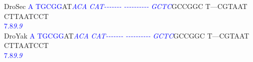 \documentclass[11pt,twoside,reqno,a4paper]{article}
\begin{document}
{DroSec	\textcolor{Blue}{A}	\textcolor{Blue}{T}\textcolor{Blue}{G}\textcolor{Blue}{C}\textcolor{Blue}{G}\textcolor{Blue}{G}AT\textit{\textcolor{Blue}{A}}\textit{\textcolor{Blue}{C}}\textit{\textcolor{Blue}{A}}	\textit{\textcolor{Blue}{C}}\textit{\textcolor{Blue}{A}}\textit{\textcolor{Blue}{T}}\textit{\textcolor{Blue}{-}}\textit{\textcolor{Blue}{-}}\textit{\textcolor{Blue}{-}}\textit{\textcolor{Blue}{-}}\textit{\textcolor{Blue}{-}}\textit{\textcolor{Blue}{-}}\textit{\textcolor{Blue}{-}}	\textit{\textcolor{Blue}{-}}\textit{\textcolor{Blue}{-}}\textit{\textcolor{Blue}{-}}\textit{\textcolor{Blue}{-}}\textit{\textcolor{Blue}{-}}\textit{\textcolor{Blue}{-}}\textit{\textcolor{Blue}{-}}\textit{\textcolor{Blue}{-}}\textit{\textcolor{Blue}{-}}\textit{\textcolor{Blue}{-}}	\textit{\textcolor{Blue}{G}}\textit{\textcolor{Blue}{C}}\textit{\textcolor{Blue}{T}}\textit{\textcolor{Blue}{C}}GCCGGC	T---CGTAAT	CTTAATCCT\\
\hspace*{7\charwidth}\hspace*{0\charwidth}\textcolor{Blue}{7.8}\hspace*{1\charwidth}\hspace*{5\charwidth}\textit{\textcolor{Blue}{9.9}}\hspace*{1\charwidth}\hspace*{1\charwidth}\hspace*{1\charwidth}\hspace*{1\charwidth}\hspace*{1\charwidth}\\
DroYak	\textcolor{Blue}{A}	\textcolor{Blue}{T}\textcolor{Blue}{G}\textcolor{Blue}{C}\textcolor{Blue}{G}\textcolor{Blue}{G}AT\textit{\textcolor{Blue}{A}}\textit{\textcolor{Blue}{C}}\textit{\textcolor{Blue}{A}}	\textit{\textcolor{Blue}{C}}\textit{\textcolor{Blue}{A}}\textit{\textcolor{Blue}{T}}\textit{\textcolor{Blue}{-}}\textit{\textcolor{Blue}{-}}\textit{\textcolor{Blue}{-}}\textit{\textcolor{Blue}{-}}\textit{\textcolor{Blue}{-}}\textit{\textcolor{Blue}{-}}\textit{\textcolor{Blue}{-}}	\textit{\textcolor{Blue}{-}}\textit{\textcolor{Blue}{-}}\textit{\textcolor{Blue}{-}}\textit{\textcolor{Blue}{-}}\textit{\textcolor{Blue}{-}}\textit{\textcolor{Blue}{-}}\textit{\textcolor{Blue}{-}}\textit{\textcolor{Blue}{-}}\textit{\textcolor{Blue}{-}}\textit{\textcolor{Blue}{-}}	\textit{\textcolor{Blue}{G}}\textit{\textcolor{Blue}{C}}\textit{\textcolor{Blue}{T}}\textit{\textcolor{Blue}{C}}GCCGGC	T---CGTAAT	CTTAATCCT\\
\hspace*{7\charwidth}\hspace*{0\charwidth}\textcolor{Blue}{7.8}\hspace*{1\charwidth}\hspace*{5\charwidth}\textit{\textcolor{Blue}{9.9}}\hspace*{1\charwidth}\hspace*{1\charwidth}\hspace*{1\charwidth}\hspace*{1\charwidth}\hspace*{1\charwidth}\\
}
\end{document}
